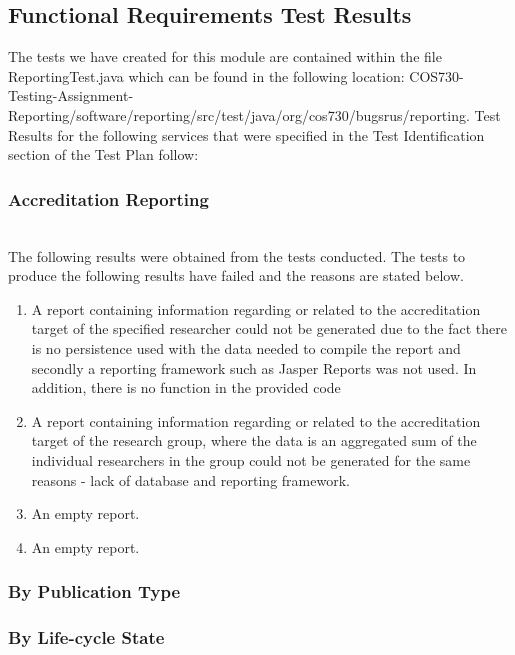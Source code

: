 \subsection{Functional Requirements Test Results}
The tests we have created for this module are contained within the file ReportingTest.java which can be found in the following location: COS730-Testing-Assignment-Reporting/software/reporting/src/test/java/org/cos730/bugsrus/reporting.
Test Results for the following services that were specified in the Test Identification section of the Test Plan follow:  
\subsubsection{Accreditation Reporting} 
\\ The following results were obtained from the tests conducted. The tests to produce the following results have failed and the reasons are stated below.
\begin{enumerate}
	\item A report containing information regarding or related to the accreditation target of the specified researcher could not be generated due to the fact there is no persistence used with the data needed to compile the report and secondly a reporting framework such as Jasper Reports was not used. In addition, there is no function in the provided code
	\item A report containing information regarding or related to the accreditation target of the research group, where the data is an aggregated sum of the individual researchers in the group could not be generated for the same reasons - lack of database and reporting framework.
	\item An empty report.
	\item An empty report. 
\end{enumerate}

\subsubsection{By Publication Type}

\subsubsection{By Life-cycle State}


